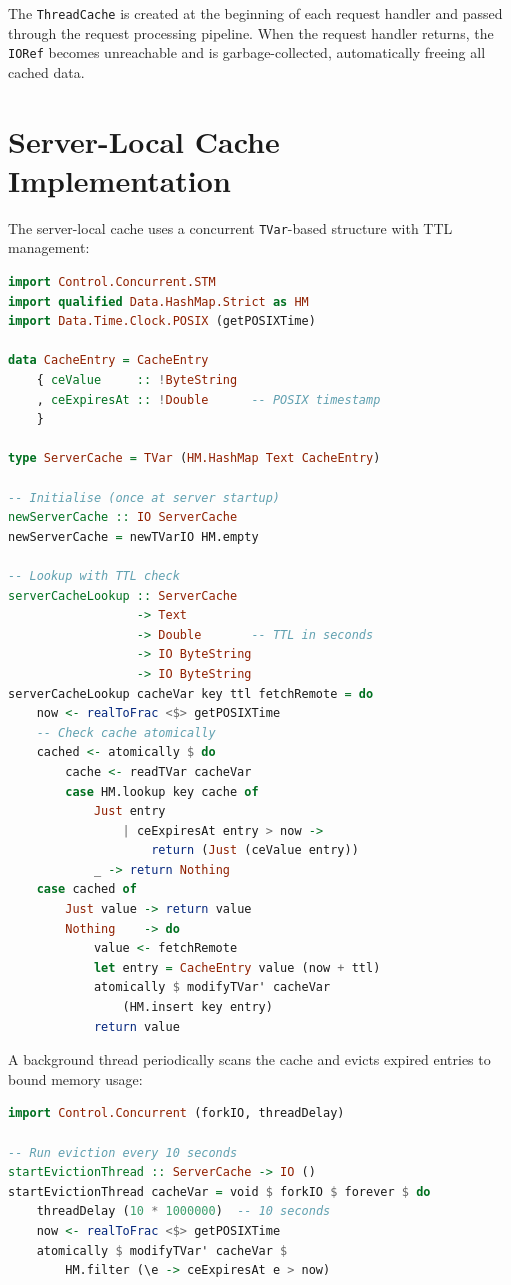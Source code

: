 \documentclass[12pt,a4paper]{report}
\begin{document}
The \texttt{ThreadCache} is created at the beginning of each request handler and passed through the request processing pipeline. When the request handler returns, the \texttt{IORef} becomes unreachable and is garbage-collected, automatically freeing all cached data.

\section{Server-Local Cache Implementation}

The server-local cache uses a concurrent \texttt{TVar}-based structure with TTL management:

\begin{lstlisting}[language=Haskell, caption={Server-Local Cache with TTL Eviction}]
import Control.Concurrent.STM
import qualified Data.HashMap.Strict as HM
import Data.Time.Clock.POSIX (getPOSIXTime)

data CacheEntry = CacheEntry
    { ceValue     :: !ByteString
    , ceExpiresAt :: !Double      -- POSIX timestamp
    }

type ServerCache = TVar (HM.HashMap Text CacheEntry)

-- Initialise (once at server startup)
newServerCache :: IO ServerCache
newServerCache = newTVarIO HM.empty

-- Lookup with TTL check
serverCacheLookup :: ServerCache
                  -> Text
                  -> Double       -- TTL in seconds
                  -> IO ByteString
                  -> IO ByteString
serverCacheLookup cacheVar key ttl fetchRemote = do
    now <- realToFrac <$> getPOSIXTime
    -- Check cache atomically
    cached <- atomically $ do
        cache <- readTVar cacheVar
        case HM.lookup key cache of
            Just entry
                | ceExpiresAt entry > now ->
                    return (Just (ceValue entry))
            _ -> return Nothing
    case cached of
        Just value -> return value
        Nothing    -> do
            value <- fetchRemote
            let entry = CacheEntry value (now + ttl)
            atomically $ modifyTVar' cacheVar
                (HM.insert key entry)
            return value
\end{lstlisting}

A background thread periodically scans the cache and evicts expired entries to bound memory usage:

\begin{lstlisting}[language=Haskell, caption={Background TTL Eviction Thread}]
import Control.Concurrent (forkIO, threadDelay)

-- Run eviction every 10 seconds
startEvictionThread :: ServerCache -> IO ()
startEvictionThread cacheVar = void $ forkIO $ forever $ do
    threadDelay (10 * 1000000)  -- 10 seconds
    now <- realToFrac <$> getPOSIXTime
    atomically $ modifyTVar' cacheVar $
        HM.filter (\e -> ceExpiresAt e > now)
\end{lstlisting}
\end{document}
